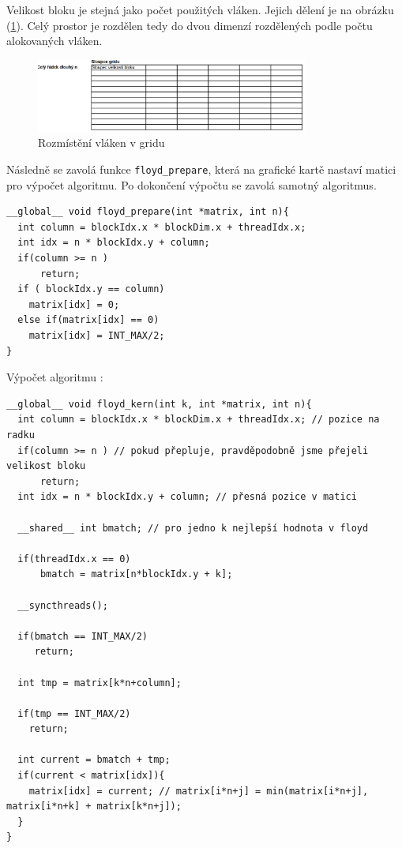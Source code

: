 \documentclass[a4paper,10pt]{article}
\begin{document}
Velikost bloku je stejná jako počet použitých vláken. Jejich dělení je na obrázku (\ref{fig:grid}). Celý prostor je rozdělen tedy do dvou dimenzí rozdělených podle počtu alokovaných vláken.

\begin{figure}[H]
  \centering
    \includegraphics[width=0.8\textwidth]{grid.png}
  \caption{Rozmístění vláken v gridu}
  \label{fig:grid}
\end{figure}

Následně se zavolá funkce \texttt{floyd\_prepare}, která na grafické kartě nastaví matici pro výpočet algoritmu. Po dokončení výpočtu se zavolá samotný algoritmus.

\begin{verbatim}
__global__ void floyd_prepare(int *matrix, int n){
  int column = blockIdx.x * blockDim.x + threadIdx.x;
  int idx = n * blockIdx.y + column;
  if(column >= n )
      return;
  if ( blockIdx.y == column)
    matrix[idx] = 0;
  else if(matrix[idx] == 0)
    matrix[idx] = INT_MAX/2;
}
\end{verbatim}

Výpočet algoritmu \cite{cudaFloyd}: 

\begin{verbatim}
__global__ void floyd_kern(int k, int *matrix, int n){
  int column = blockIdx.x * blockDim.x + threadIdx.x; // pozice na radku
  if(column >= n ) // pokud přepluje, pravděpodobně jsme přejeli velikost bloku
      return;
  int idx = n * blockIdx.y + column; // přesná pozice v matici
  
  __shared__ int bmatch; // pro jedno k nejlepší hodnota v floyd
  
  if(threadIdx.x == 0)
      bmatch = matrix[n*blockIdx.y + k];
  
  __syncthreads();
  
  if(bmatch == INT_MAX/2)
     return;
  
  int tmp = matrix[k*n+column];
  
  if(tmp == INT_MAX/2) 
    return;
  
  int current = bmatch + tmp;
  if(current < matrix[idx]){
    matrix[idx] = current; // matrix[i*n+j] = min(matrix[i*n+j], matrix[i*n+k] + matrix[k*n+j]);
  }
}
\end{verbatim}
\end{document}
